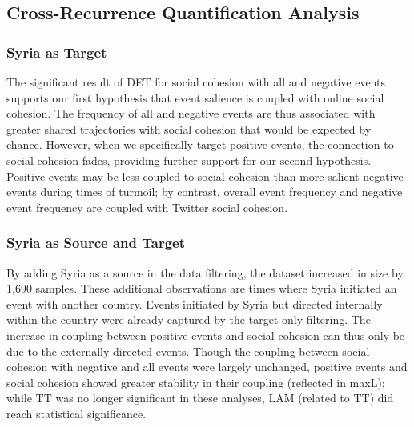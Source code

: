 \documentclass[english,man]{apa6}
\begin{document}
\hypertarget{cross-recurrence-quantification-analysis-2}{%
\subsection{Cross-Recurrence Quantification Analysis}\label{cross-recurrence-quantification-analysis-2}}

\hypertarget{syria-as-target-2}{%
\subsubsection{Syria as Target}\label{syria-as-target-2}}

The significant result of DET for social cohesion with all and negative events
supports our first hypothesis that event salience is coupled with online social
cohesion. The frequency of all and negative events are thus associated with
greater shared trajectories with social cohesion that would be expected by
chance. However, when we specifically target positive events, the connection to
social cohesion fades, providing further support for our second hypothesis.
Positive events may be less coupled to social cohesion than more salient
negative events during times of turmoil; by contrast, overall event frequency
and negative event frequency are coupled with Twitter social cohesion.

\hypertarget{syria-as-source-and-target-2}{%
\subsubsection{Syria as Source and Target}\label{syria-as-source-and-target-2}}

By adding Syria as a source in the data filtering, the dataset increased in size
by 1,690 samples. These additional observations are times where Syria initiated
an event with another country. Events initiated by Syria but directed internally
within the country were already captured by the target-only filtering. The
increase in coupling between positive events and social cohesion can thus only
be due to the externally directed events. Though the coupling between social
cohesion with negative and all events were largely unchanged, positive events
and social cohesion showed greater stability in their coupling (reflected in
maxL); while TT was no longer significant in these analyses, LAM (related to TT)
did reach statistical significance.
\end{document}
